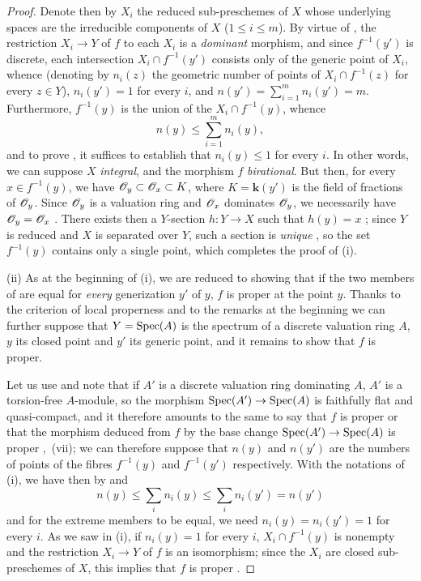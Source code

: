 \begin{proof}
Denote then by $X_i$ the reduced sub-preschemes of $X$ whose underlying spaces are the irreducible components of $X$ ($1\leq i\leq m$).
By virtue of , the restriction $X_i\to Y$ of $f$ to each $X_i$ is a \emph{dominant} morphism, and since $f^{-1}(y')$ is discrete, each intersection $X_i\cap f^{-1}(y')$ consists only of the generic point of $X_i$, whence (denoting by $n_i(z)$ the geometric number of points of $X_i\cap f^{-1}(z)$ for every $z\in Y$), $n_i(y')=1$ for every $i$, and $n(y')=\sum_{i=1}^{m} n_i(y')=m$.
Furthermore, $f^{-1}(y)$ is the union of the $X_i\cap f^{-1}(y)$, whence
\begin{equation}
\tag{15.5.2.3}
\label{IV.15.5.2.3}
  n(y) \leq \sum_{i=1}^{m} n_i(y),
\end{equation}
and to prove , it suffices to establish that $n_i(y)\leq 1$ for every $i$.
In other words, we can suppose $X$ \emph{integral}, and the morphism $f$ \emph{birational}.
But then, for every $x\in f^{-1}(y)$, we have $\mathscr{O}_y\subset\mathscr{O}_x\subset K$, where $K=\boldsymbol{k}(y')$ is the field of fractions of $\mathscr{O}_y$.
Since $\mathscr{O}_y$ is a valuation ring and $\mathscr{O}_x$ dominates $\mathscr{O}_y$, we necessarily have $\mathscr{O}_y=\mathscr{O}_x$ .
There exists then a $Y$-section $h:Y\to X$ such that $h(y)=x$ ; since $Y$ is reduced and $X$ is separated over $Y$, such a section is \emph{unique} , so the set $f^{-1}(y)$ contains only a single point, which completes the proof of (i).

(ii)
As at the beginning of (i), we are reduced to showing that if the two members of  are equal for \emph{every} generization $y'$ of $y$, $f$ is proper at the point $y$.
Thanks to the criterion of local properness  and to the remarks at the beginning we can further suppose that $Y=\operatorname{Spec}(A)$ is the spectrum of a discrete valuation ring $A$, $y$ its closed point and $y'$ its generic point, and it remains to show that $f$ is proper.

Let us use  and note that if $A'$ is a discrete valuation ring dominating $A$, $A'$ is a torsion-free $A$-module, so the morphism $\operatorname{Spec}(A')\to\operatorname{Spec}(A)$ is faithfully flat and quasi-compact, and it therefore amounts to the same to say that $f$ is proper or that the morphism deduced from $f$ by the base change $\operatorname{Spec}(A')\to\operatorname{Spec}(A)$ is
proper ,~(vii); we can therefore suppose that $n(y)$ and $n(y')$ are the numbers of points of the fibres $f^{-1}(y)$ and $f^{-1}(y')$ respectively.
With the notations of (i), we have then by  and 
\begin{equation}
\tag{15.5.2.4}
\label{IV.15.5.2.4}
  n(y) \leq \sum_i n_i(y) \leq \sum_i n_i(y') = n(y')
\end{equation}
and for the extreme members to be equal, we need $n_i(y)=n_i(y')=1$ for every $i$.
As we saw in (i), if $n_i(y)=1$ for every $i$, $X_i\cap f^{-1}(y)$ is nonempty and the restriction $X_i\to Y$ of $f$ is an isomorphism; since the $X_i$ are closed sub-preschemes of $X$, this implies that $f$ is proper .


\end{proof}
